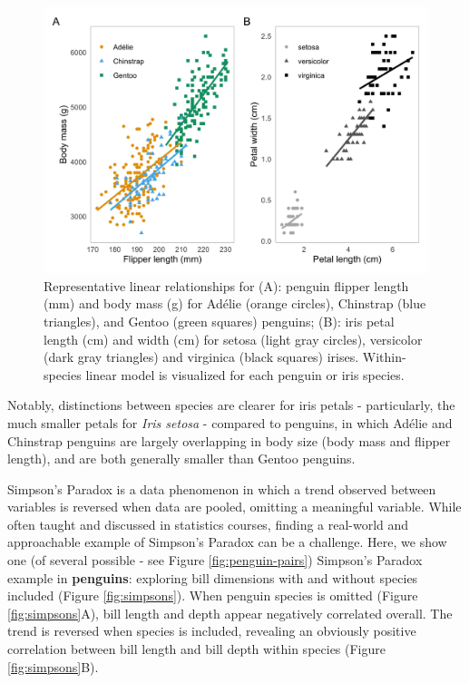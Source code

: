\begin{Schunk}
\begin{figure}[htbp]

{\centering \includegraphics[width=\textwidth]{figs/linear-example-1} 

}

\caption[Representative linear relationships for (A)]{Representative linear relationships for (A): penguin flipper length (mm) and body mass (g) for Adélie (orange circles), Chinstrap (blue triangles), and Gentoo (green squares) penguins; (B): iris petal length (cm) and width (cm) for setosa (light gray circles), versicolor (dark gray triangles) and virginica (black squares) irises. Within-species linear model is visualized for each penguin or iris species.}\label{fig:linear-example}
\end{figure}
\end{Schunk}

Notably, distinctions between species are clearer for iris petals -
particularly, the much smaller petals for \emph{Iris setosa} - compared
to penguins, in which Adélie and Chinstrap penguins are largely
overlapping in body size (body mass and flipper length), and are both
generally smaller than Gentoo penguins.

Simpson's Paradox is a data phenomenon in which a trend observed between
variables is reversed when data are pooled, omitting a meaningful
variable. While often taught and discussed in statistics courses,
finding a real-world and approachable example of Simpson's Paradox can
be a challenge. Here, we show one (of several possible - see Figure
\ref{fig:penguin-pairs}) Simpson's Paradox example in \textbf{penguins}:
exploring bill dimensions with and without species included (Figure
\ref{fig:simpsons}). When penguin species is omitted (Figure
\ref{fig:simpsons}A), bill length and depth appear negatively correlated
overall. The trend is reversed when species is included, revealing an
obviously positive correlation between bill length and bill depth within
species (Figure \ref{fig:simpsons}B).

